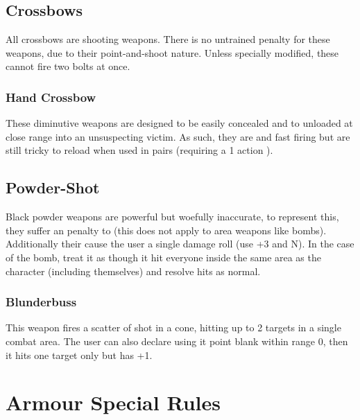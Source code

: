 
\subsection{Crossbows}
All crossbows are shooting weapons. There is no untrained penalty for these weapons, due to their point-and-shoot nature. Unless specially modified, these cannot fire two bolts at once.

\subsubsection{Hand Crossbow}
These diminutive weapons are designed to be easily concealed and to unloaded at close range into an unsuspecting victim. As such, they are  and fast firing but are still tricky to reload when used in pairs (requiring a 1 action ).

\subsection{Powder-Shot}
Black powder weapons are powerful but woefully inaccurate, to represent this, they suffer an  penalty to  (this does not apply to area weapons like bombs). Additionally their  cause the user a single damage roll (use  +3 and  N). In the case of the bomb, treat it as though it hit everyone inside the same area as the character (including themselves) and resolve hits as normal.

\subsubsection{Blunderbuss}
This weapon fires a scatter of shot in a cone, hitting up to 2 targets in a single combat area. The user can also declare using it point blank within range 0, then it hits one target only but has  +1.





\section{Armour Special Rules}
\label{sec:armspec}

